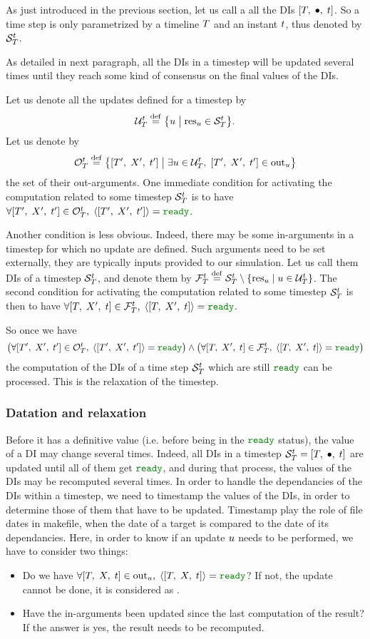 As just introduced in the previous section, let us call a  all the DIs $\left[ T,\;\bullet,\;t \right]$. So a time step is only parametrized by a timeline $T$ and an instant $t$, thus denoted by ${{\cal S}}_{T}^{t}$.

As detailed in next paragraph, all the DIs in a timestep will be updated several times until they reach some kind of consensus on the final values of the DIs.

Let us denote all the updates defined for a timestep by
$${{{\cal U}}_{T}^{t}}\;{\stackrel{\mathrm{def}}{=}}\;{\left\{u\; \middle| \; {{\mathrm{res}}_{u}}\in{{{\cal S}}_{T}^{t}}\right\}}.\nonumber$$ Let us denote by $${{{\cal O}}_{T}^{t}}\;{\stackrel{\mathrm{def}}{=}}\;{\left\{\left[ {T}^{\prime},\;{X}^{\prime},\;{t}^{\prime} \right]\; \middle| \; \exists {{u}\in{{{\cal U}}_{T}^{t}}},\; {{\left[ {T}^{\prime},\;{X}^{\prime},\;{t}^{\prime} \right]}\in{{\mathrm{out}}_{u}}}\right\}}\nonumber$$ the set of their out-arguments. One immediate condition for activating the computation related to some timestep ${{\cal S}}_{T}^{t}$ is to have $\cxTSOAct$.

Another condition is less obvious. Indeed, there may be some in-arguments in a timestep for which no update are defined. Such arguments need to be set externally, they are typically inputs provided to our simulation. Let us call them  DIs of a timestep ${{\cal S}}_{T}^{t}$, and denote them by ${{{\cal F}}_{T}^{t}}\;{\stackrel{\mathrm{def}}{=}}\;{{{{\cal S}}_{T}^{t}}\setminus{\left\{{\mathrm{res}}_{u}\; \middle| \; {u}\in{{{\cal U}}_{T}^{t}}\right\}}}$. The second condition for activating  the computation related to some timestep ${{\cal S}}_{T}^{t}$ is then to have $\cxTSFAct$.

So once we have $$\cxTSAct$$ the computation of the DIs of a time step ${{\cal S}}_{T}^{t}$ which are still $\cxReady$ can be processed. This is the relaxation of the timestep.


\subsubsection{Datation and relaxation}

Before it has a definitive value (i.e. before being in the $\cxReady$ status), the value of a DI may change several times. Indeed, all DIs in a timestep ${{{\cal S}}_{T}^{t}}={\left[ T,\;\bullet,\;t \right]}$ are updated until all of them get $\cxReady$, and during that process, the values of the DIs may be recomputed several times. In order to handle the dependancies of the DIs within a timestep, we need to timestamp the values of the DIs, in order to determine those of them that have to be updated. Timestamp play the role of file dates in makefile, when the date of a target is compared to the date of its dependancies. Here, in order to know if an update $u$ needs to be performed, we have to consider two things:
\begin{itemize}
\item Do we have $\cxAllReady$? If not, the update cannot be done, it is considered as .
\item Have the in-arguments been updated since the last computation of the result? If the answer is yes, the result needs to be recomputed.
\end{itemize}

